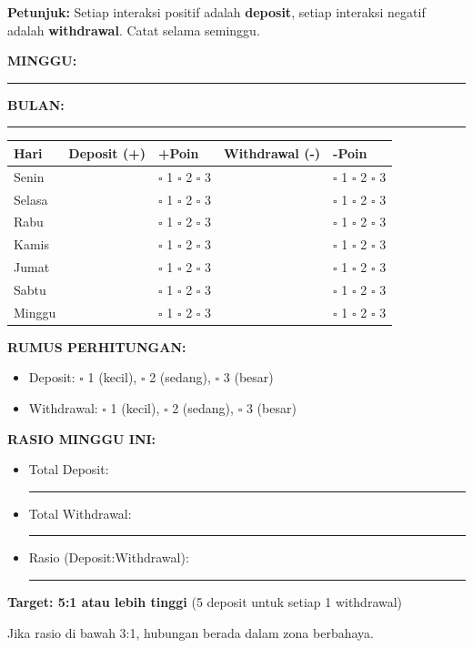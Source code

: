 \begin{exercisebox}
\textbf{Petunjuk:} Setiap interaksi positif adalah \textbf{deposit}, setiap interaksi negatif adalah \textbf{withdrawal}. Catat selama seminggu.

\vspace{0.3cm}
\textbf{MINGGU:} \rule{3cm}{0.4pt} \hspace{1cm} \textbf{BULAN:} \rule{3cm}{0.4pt}

\begin{center}
\renewcommand{\arraystretch}{1.4}
\begin{tabular}{|p{2cm}|p{4.5cm}|p{2cm}|p{4.5cm}|p{2cm}|}
\hline
\rowcolor{sagegreen!20}
\textbf{Hari} & \textbf{Deposit (+)} & \textbf{+Poin} & \textbf{Withdrawal (-)} & \textbf{-Poin} \\
\hline
Senin & & $\square$ 1 $\square$ 2 $\square$ 3 & & $\square$ 1 $\square$ 2 $\square$ 3 \\
\hline
Selasa & & $\square$ 1 $\square$ 2 $\square$ 3 & & $\square$ 1 $\square$ 2 $\square$ 3 \\
\hline
Rabu & & $\square$ 1 $\square$ 2 $\square$ 3 & & $\square$ 1 $\square$ 2 $\square$ 3 \\
\hline
Kamis & & $\square$ 1 $\square$ 2 $\square$ 3 & & $\square$ 1 $\square$ 2 $\square$ 3 \\
\hline
Jumat & & $\square$ 1 $\square$ 2 $\square$ 3 & & $\square$ 1 $\square$ 2 $\square$ 3 \\
\hline
Sabtu & & $\square$ 1 $\square$ 2 $\square$ 3 & & $\square$ 1 $\square$ 2 $\square$ 3 \\
\hline
Minggu & & $\square$ 1 $\square$ 2 $\square$ 3 & & $\square$ 1 $\square$ 2 $\square$ 3 \\
\hline
\end{tabular}
\end{center}

\vspace{0.3cm}
\textbf{RUMUS PERHITUNGAN:}
\begin{itemize}[itemsep=0.1cm]
    \item Deposit: $\square$ 1 (kecil), $\square$ 2 (sedang), $\square$ 3 (besar)
    \item Withdrawal: $\square$ 1 (kecil), $\square$ 2 (sedang), $\square$ 3 (besar)
\end{itemize}

\textbf{RASIO MINGGU INI:}
\begin{itemize}[itemsep=0.1cm]
    \item Total Deposit: \rule{2cm}{0.4pt}
    \item Total Withdrawal: \rule{2cm}{0.4pt}
    \item Rasio (Deposit:Withdrawal): \rule{3cm}{0.4pt}
\end{itemize}

\begin{tipbox}
\textbf{Target: 5:1 atau lebih tinggi} (5 deposit untuk setiap 1 withdrawal)

Jika rasio di bawah 3:1, hubungan berada dalam zona berbahaya.
\end{tipbox}
\end{exercisebox}

